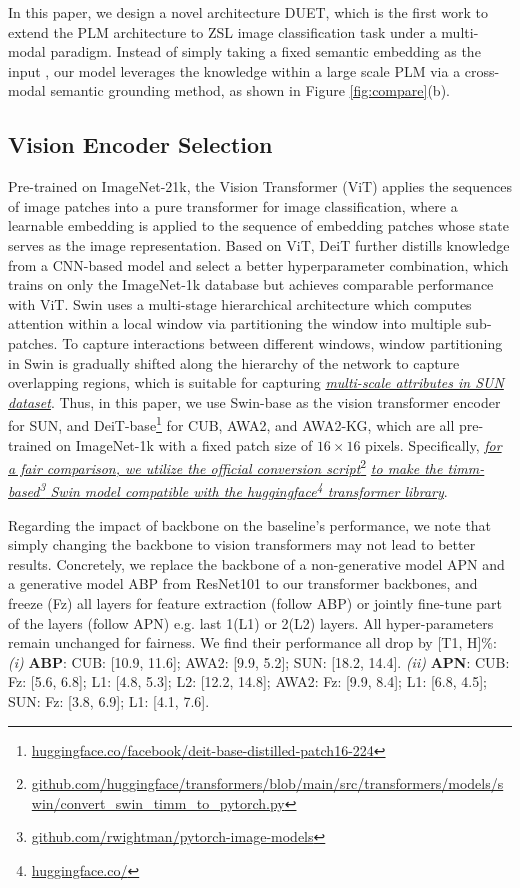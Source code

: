 \documentclass[letterpaper]{article} \usepackage{aaai23}  \usepackage{times}  \usepackage{helvet}  \usepackage{courier}  \usepackage[hyphens]{url}  \usepackage{graphicx} \urlstyle{rm} \def\UrlFont{\rm}  \usepackage{natbib}  \usepackage{caption} \frenchspacing  \setlength{\pdfpagewidth}{8.5in}  \setlength{\pdfpageheight}{11in}  \usepackage{algorithm}
\newcommand{\fy}[1]{{\color{black}#1}}
\begin{document}
In this paper, we design a novel architecture DUET, which is the first work to extend the PLM architecture to ZSL image classification task under a multi-modal paradigm.
Instead of  simply \fy{taking} a fixed semantic embedding as the input \cite{DBLP:journals/corr/abs-2201-00577}, our model leverages the knowledge within a large scale PLM via a cross-modal semantic grounding method, as shown in Figure \ref{fig:compare}(b).

\subsection{Vision Encoder Selection}
Pre-trained on ImageNet-21k, the Vision Transformer (ViT) \cite{DBLP:conf/iclr/DosovitskiyB0WZ21} applies the sequences of image patches into {a} pure transformer for image classification, where a learnable embedding is applied to the sequence of embedding patches whose state serves as the image representation.
Based on ViT, DeiT \cite{DBLP:conf/icml/TouvronCDMSJ21} 
further distill{s knowledge from a CNN-based model} 
and select {a} better hyperparameter combination, {which trains on only the ImageNet-1k database but achieves comparable performance with ViT.
Swin \cite{DBLP:conf/iccv/LiuL00W0LG21} 
use\fy{s} a multi-stage hierarchical architecture which 
computes attention within a local window via partitioning the window into multiple sub-patches.}
To capture interactions between different windows, window partitioning in Swin is gradually shifted along the {hierarchy of the network} to capture overlapping regions, 
which is suitable for capturing \ul{\emph{multi-scale attributes in SUN dataset}}.
Thus, in this paper, 
we use Swin-base as the vision transformer encoder for SUN,
and DeiT-base\footnote{\url{huggingface.co/facebook/deit-base-distilled-patch16-224}}  
for CUB, AWA2, and AWA2-KG, 
which are all pre-trained on ImageNet-1k with a fixed patch size of $16 \times 16$ pixels.
Specifically, \ul{\emph{for a fair comparison, we utilize the official conversion script}}\footnote{
\url{github.com/huggingface/transformers/blob/main/src/transformers/models/swin/convert_swin_timm_to_pytorch.py}}
\ul{\emph{to make the timm-based\footnote{\url{github.com/rwightman/pytorch-image-models}} Swin model compatible with the huggingface\footnote{\url{huggingface.co/}} transformer library}}. 

Regarding the impact of backbone on the baseline’s performance, we note that simply changing the backbone to vision transformers may not lead to better results. Concretely, we replace the backbone of a non-generative model APN \cite{DBLP:conf/nips/XuXWSA20} and a generative model ABP \cite{DBLP:conf/iccv/ZhuXLE19} from ResNet101 to our transformer backbones, and freeze (Fz) all layers for feature extraction (follow ABP) or jointly fine-tune part of the layers (follow APN) e.g. last 1(L1) or 2(L2) layers. All hyper-parameters remain unchanged for fairness. We find their performance all drop by [T1, H]\%:
\textit{(i)} \textbf{ABP}:
CUB: [10.9, 11.6]; AWA2: [9.9, 5.2]; SUN: [18.2, 14.4].
\textit{(ii)}  \textbf{APN}:
CUB: Fz: [5.6, 6.8]; L1: [4.8, 5.3]; L2: [12.2, 14.8];
AWA2: Fz: [9.9, 8.4]; L1: [6.8, 4.5];
SUN: Fz: [3.8, 6.9]; L1: [4.1, 7.6].
\end{document}
